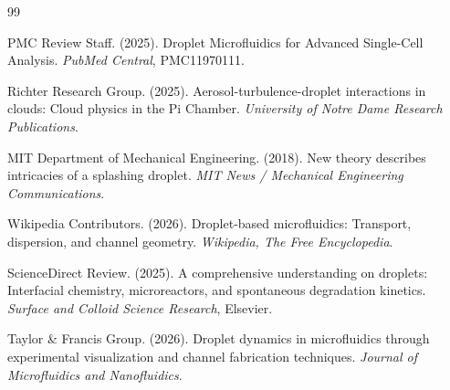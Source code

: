 \documentclass{article}
\begin{document}
\begin{thebibliography}{99}

PMC Review Staff. (2025).
\newblock Droplet Microfluidics for Advanced Single-Cell Analysis.
\newblock \emph{PubMed Central}, PMC11970111.

Richter Research Group. (2025).
\newblock Aerosol-turbulence-droplet interactions in clouds: Cloud physics in the Pi Chamber.
\newblock \emph{University of Notre Dame Research Publications}.

MIT Department of Mechanical Engineering. (2018).
\newblock New theory describes intricacies of a splashing droplet.
\newblock \emph{MIT News / Mechanical Engineering Communications}.

Wikipedia Contributors. (2026).
\newblock Droplet-based microfluidics: Transport, dispersion, and channel geometry.
\newblock \emph{Wikipedia, The Free Encyclopedia}.

ScienceDirect Review. (2025).
\newblock A comprehensive understanding on droplets: Interfacial chemistry, microreactors, and spontaneous degradation kinetics.
\newblock \emph{Surface and Colloid Science Research}, Elsevier.

Taylor \& Francis Group. (2026).
\newblock Droplet dynamics in microfluidics through experimental visualization and channel fabrication techniques.
\newblock \emph{Journal of Microfluidics and Nanofluidics}.

\end{thebibliography}
\end{document}
